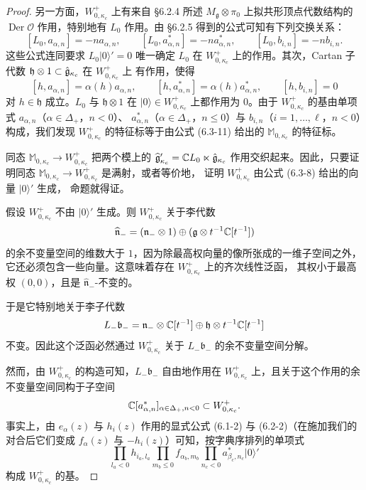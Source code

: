 \begin{proof}
    另一方面，$W^+_{0,\kappa_c}$ 上有来自 \S6.2.4 所述
    $M_{\mathfrak g}\otimes\pi_0$ 上拟共形顶点代数结构的
    $\operatorname{Der}\mathcal O$ 作用，特别地有 $L_0$ 作用。由 \S6.2.5
    得到的公式可知有下列交换关系：
    \[
        [L_0,a_{\alpha,n}]=-na_{\alpha,n},\qquad
        [L_0,a^*_{\alpha,n}]=-na^*_{\alpha,n},\qquad
        [L_0,b_{i,n}]=-nb_{i,n}.
    \]
    这些公式连同要求 $L_0|0\rangle'=0$ 唯一确定 $L_0$ 在
    $W^+_{0,\kappa_c}$ 上的作用。其次，Cartan 子代数
    $\mathfrak h\otimes1\subset\hat{\mathfrak{g}}_{\kappa_c}$ 在 $W^+_{0,\kappa_c}$ 上
    有作用，使得
    \[
        [h,a_{\alpha,n}]=\alpha(h)a_{\alpha,n},\qquad
        [h,a^*_{\alpha,n}]=\alpha(h)a^*_{\alpha,n},\qquad
        [h,b_{i,n}]=0
    \]
    对 $h\in\mathfrak h$ 成立。$L_0$ 与 $\mathfrak h\otimes1$ 在
    $|0\rangle\in W^+_{0,\kappa_c}$ 上都作用为 $0$。由于
    $W^+_{0,\kappa_c}$ 的基由单项式
    $a_{\alpha,n}$（$\alpha\in\Delta_+$，$n<0$）、
    $a^*_{\alpha,n}$（$\alpha\in\Delta_+$，$n\le0$）与
    $b_{i,n}$（$i=1,\dots,\ell$，$n<0$）构成，我们发现
    $W^+_{0,\kappa_c}$ 的特征标等于由公式 (6.3-11) 给出的
    $\mathbb M_{0,\kappa_c}$ 的特征标。

    同态 $\mathbb M_{0,\kappa_c}\to W^+_{0,\kappa_c}$ 把两个模上的
    $\widehat{\mathfrak g}'_{\kappa_c}=\mathbb{C} L_0\ltimes\hat{\mathfrak{g}}_{\kappa_c}$
    作用交织起来。因此，只要证明同态
    $\mathbb M_{0,\kappa_c}\to W^+_{0,\kappa_c}$ 是满射，或者等价地，
    证明 $W^+_{0,\kappa_c}$ 由公式 (6.3-8) 给出的向量 $|0\rangle'$ 生成，
    命题就得证。

    假设 $W^+_{0,\kappa_c}$ 不由 $|0\rangle'$ 生成。则
    $W^+_{0,\kappa_c}$ 关于李代数
    \[
        \widehat{\mathfrak n}_-=(\mathfrak n_-\otimes1)
        \oplus(\mathfrak{g}\otimes t^{-1}\mathbb{C}[t^{-1}])
    \]
    的余不变量空间的维数大于 $1$，因为除最高权向量的像所张成的一维子空间之外，
    它还必须包含一些向量。这意味着存在 $W^+_{0,\kappa_c}$ 上的齐次线性泛函，
    其权小于最高权 $(0,0)$，且是 $\widehat{\mathfrak n}_-$-不变的。

    于是它特别地关于李子代数
    \[
        L_-\mathfrak b_-=\mathfrak n_-\otimes\mathbb{C}[t^{-1}]
        \oplus\mathfrak h\otimes t^{-1}\mathbb{C}[t^{-1}]
    \]
    不变。因此这个泛函必然通过 $W^+_{0,\kappa_c}$ 关于
    $L_-\mathfrak b_-$ 的余不变量空间分解。

    然而，由 $W^+_{0,\kappa_c}$ 的构造可知，$L_-\mathfrak b_-$ 自由地作用在
    $W^+_{0,\kappa_c}$ 上，且关于这个作用的余不变量空间同构于子空间
    \[
        \mathbb{C}[a^*_{\alpha,n}]_{\alpha\in\Delta_+,n<0}
        \subset W^+_{0,\kappa_c}.
    \]
    事实上，由 $e_\alpha(z)$ 与 $h_i(z)$ 作用的显式公式
    (6.1-2) 与 (6.2-2)（在施加我们的对合后它们变成 $f_\alpha(z)$ 与
    $-h_i(z)$）可知，按字典序排列的单项式
    \[
        \prod_{l_a<0}h_{i_a,l_a}\prod_{m_b\le0}f_{\alpha_b,m_b}
        \prod_{n_c<0}a^*_{\beta_c,n_c}|0\rangle'
    \]
    构成 $W^+_{0,\kappa_c}$ 的基。


\end{proof}
